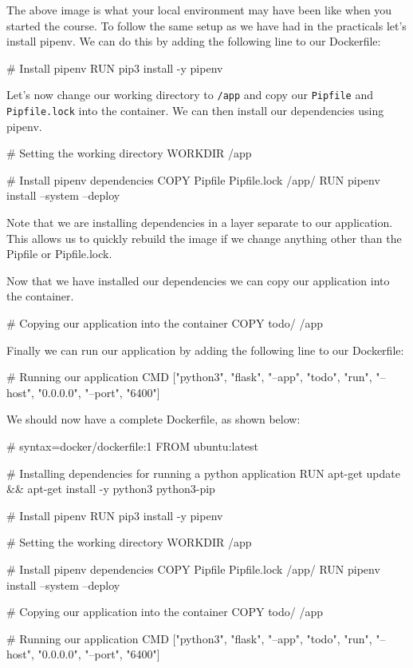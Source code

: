 \documentclass{csse4400}
\begin{document}
The above image is what your local environment may have been like when you started the course.
To follow the same setup as we have had in the practicals let's install pipenv.
We can do this by adding the following line to our Dockerfile:

\begin{code}[language=docker,numbers=none]{}
# Install pipenv
RUN pip3 install -y pipenv
\end{code}

Let's now change our working directory to \texttt{/app} and copy our \texttt{Pipfile} and \texttt{Pipfile.lock} into the container.
We can then install our dependencies using pipenv.

\begin{code}[language=docker,numbers=none]{}
# Setting the working directory
WORKDIR /app

# Install pipenv dependencies
COPY Pipfile Pipfile.lock /app/
RUN pipenv install --system --deploy
\end{code}

Note that we are installing dependencies in a layer separate to our application.
This allows us to quickly rebuild the image if we change anything other than the Pipfile or Pipfile.lock.

Now that we have installed our dependencies we can copy our application into the container.

\begin{code}[language=docker,numbers=none]{}
# Copying our application into the container
COPY todo/ /app
\end{code}

Finally we can run our application by adding the following line to our Dockerfile:

\begin{code}[language=docker,numbers=none]{}
# Running our application
CMD ["python3", "flask", "--app", "todo", "run", "--host", "0.0.0.0", "--port", "6400"]
\end{code}

We should now have a complete Dockerfile, as shown below:

\begin{code}[language=docker,numbers=none]{}
# syntax=docker/dockerfile:1
FROM ubuntu:latest

# Installing dependencies for running a python application
RUN apt-get update && apt-get install -y python3 python3-pip

# Install pipenv
RUN pip3 install -y pipenv

# Setting the working directory
WORKDIR /app

# Install pipenv dependencies
COPY Pipfile Pipfile.lock /app/
RUN pipenv install --system --deploy

# Copying our application into the container
COPY todo/ /app

# Running our application
CMD ["python3", "flask", "--app", "todo", "run", "--host", "0.0.0.0", "--port", "6400"]
\end{code}
\end{document}
